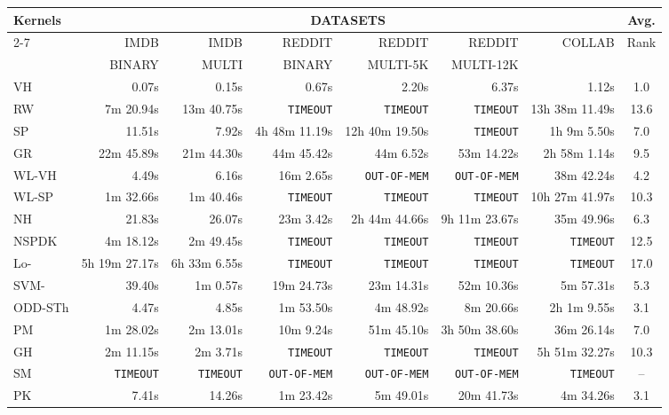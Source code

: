 \documentclass[twoside,11pt]{article}
\begin{document}
\begin{table}[t]
\centering
\scriptsize
\begin{sc}
\def\arraystretch{1.1}
\resizebox{\textwidth}{!} {
\begin{tabular}{lrrrrrrc} \hline
\multirow{3}{*}{Kernels} & \multicolumn{6}{c}{DATASETS} & \multirow{2}{*}{Avg.} \\ \cline{2-7}
& IMDB & IMDB & REDDIT & REDDIT & REDDIT & \multirow{2}{*}{COLLAB} & \multirow{2}{*}{Rank}\\
& BINARY & MULTI & BINARY & MULTI-5K & MULTI-12K & & \\ \hline
VH & 0.07s & 0.15s & 0.67s & 2.20s & 6.37s & 1.12s & 1.0\\ 
RW & 7m 20.94s & 13m 40.75s & \texttt{TIMEOUT} & \texttt{TIMEOUT} & \texttt{TIMEOUT} & 13h 38m 11.49s & 13.6 \\ 
SP & 11.51s & 7.92s & 4h 48m 11.19s & 12h 40m 19.50s & \texttt{TIMEOUT} & 1h 9m 5.50s & 7.0\\ 
GR & 22m 45.89s & 21m 44.30s & 44m 45.42s & 44m 6.52s & 53m 14.22s & 2h 58m 1.14s & 9.5 \\ 
WL-VH & 4.49s & 6.16s & 16m 2.65s & \texttt{OUT-OF-MEM} & \texttt{OUT-OF-MEM} & 38m 42.24s & 4.2\\ 
WL-SP & 1m 32.66s & 1m 40.46s & \texttt{TIMEOUT} & \texttt{TIMEOUT} & \texttt{TIMEOUT} & 10h 27m 41.97s & 10.3 \\
NH & 21.83s & 26.07s & 23m 3.42s & 2h 44m 44.66s & 9h 11m 23.67s & 35m 49.96s & 6.3 \\ 
NSPDK & 4m 18.12s & 2m 49.45s & \texttt{TIMEOUT} & \texttt{TIMEOUT} & \texttt{TIMEOUT} & \texttt{TIMEOUT} & 12.5 \\ 
Lo- & 5h 19m 27.17s & 6h 33m 6.55s & \texttt{TIMEOUT} & \texttt{TIMEOUT} & \texttt{TIMEOUT} & \texttt{TIMEOUT} & 17.0 \\ 
SVM- & 39.40s & 1m 0.57s & 19m 24.73s & 23m 14.31s & 52m 10.36s & 5m 57.31s & 5.3 \\ 
ODD-STh & 4.47s & 4.85s & 1m 53.50s & 4m 48.92s & 8m 20.66s & 2h 1m 9.55s & 3.1 \\ 
PM & 1m 28.02s & 2m 13.01s & 10m 9.24s & 51m 45.10s & 3h 50m 38.60s & 36m 26.14s & 7.0\\ 
GH & 2m 11.15s & 2m 3.71s & \texttt{TIMEOUT} & \texttt{TIMEOUT} & \texttt{TIMEOUT} & 5h 51m 32.27s & 10.3 \\ 
SM & \texttt{TIMEOUT} & \texttt{TIMEOUT} & \texttt{OUT-OF-MEM} & \texttt{OUT-OF-MEM} & \texttt{OUT-OF-MEM} & \texttt{TIMEOUT} & -- \\ 
PK & 7.41s & 14.26s & 1m 23.42s & 5m 49.01s & 20m 41.73s & 4m 34.26s & 3.1 \\ 

\end{tabular}}
\end{sc}
\end{table}
\end{document}
